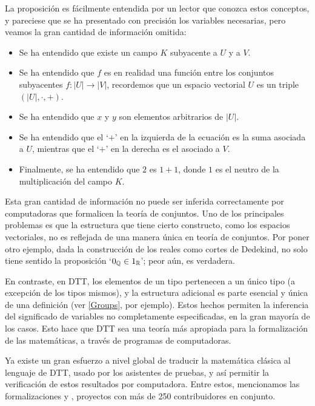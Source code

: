 \documentclass[../main.tex]{subfiles}
\begin{document}
La proposici\'on es f\'acilmente entendida por un lector que conozca estos conceptos, y pareciese que se ha presentado con precisión los variables necesarias, pero veamos la gran cantidad de informaci\'on omitida:

\begin{itemize}
    \item Se ha entendido que existe un campo $K$ subyacente a $U$ y a $V$.
    \item Se ha entendido que $f$ es en realidad una función entre los conjuntos subyacentes $f: |U| \to |V|$, recordemos que un espacio vectorial $U$ es un triple $(|U|,\cdot,+)$.
    \item Se ha entendido que $x$ y $y$ son elementos arbitrarios de $|U|$.
    \item Se ha entendido que el `$+$' en la izquierda de la ecuaci\'on es la suma asociada a $U$, mientras que el `$+$' en la derecha es el asociado a $V$.
    \item Finalmente, se ha entendido que $2$ es $1+1$, donde $1$ es el neutro de la multiplicaci\'on del campo $K$.
\end{itemize}

Esta gran cantidad de informaci\'on no puede ser inferida correctamente por computadoras que formalicen la teor\'ia de conjuntos.
Uno de los principales problemas es que la estructura que tiene cierto constructo, como los espacios vectoriales, no es reflejada de una manera \'unica en teor\'ia de conjuntos.
Por poner otro ejemplo, dada la construcci\'on de los reales como cortes de Dedekind, no solo tiene sentido la proposici\'on `$0_\mathbb{Q} \in 1_\mathbb{R}$'; peor a\'un, es verdadera.

En contraste, en DTT, los elementos de un tipo pertenecen a un \'unico tipo (a excepción de los tipos mismos), y la estructura adicional es parte esencial y \'unica de una definición (ver \ref{Groups}, por ejemplo).
Estos hechos permiten la inferencia del significado de variables no completamente especificadas, en la gran mayor\'ia de los casos.
Esto hace que DTT sea una teor\'ia m\'as apropiada para la formalizaci\'on de las matemáticas, a trav\'es de programas de computadoras.

Ya existe un gran esfuerzo a nivel global de traducir la matemática cl\'asica al lenguaje de DTT, usado por los asistentes de pruebas, y as\'i permitir la verificaci\'on de estos resultados por computadora.
Entre estos, mencionamos las formalizaciones \cite{mahboubi_mathematical_2021} y \cite{the_mathlib_community_lean_2020}, proyectos con m\'as de 250 contribuidores en conjunto.
\end{document}
